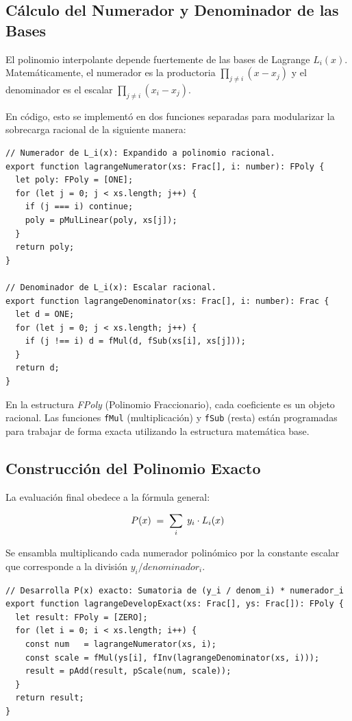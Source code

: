 \documentclass[conference]{IEEEtran}
\begin{document}
\subsection{Cálculo del Numerador y Denominador de las Bases}
El polinomio interpolante depende fuertemente de las bases de Lagrange $L_i(x)$. Matemáticamente, el numerador es la productoria $\prod_{j \neq i} (x - x_j)$ y el denominador es el escalar $\prod_{j \neq i} (x_i - x_j)$. 

\vspace{0.2cm}

En código, esto se implementó en dos funciones separadas para modularizar la sobrecarga racional de la siguiente manera:

\begin{lstlisting}[caption={Algoritmo para calcular las bases racionales}, label={lst:bases}]
// Numerador de L_i(x): Expandido a polinomio racional.
export function lagrangeNumerator(xs: Frac[], i: number): FPoly {
  let poly: FPoly = [ONE];
  for (let j = 0; j < xs.length; j++) {
    if (j === i) continue;
    poly = pMulLinear(poly, xs[j]);
  }
  return poly;
}

// Denominador de L_i(x): Escalar racional.
export function lagrangeDenominator(xs: Frac[], i: number): Frac {
  let d = ONE;
  for (let j = 0; j < xs.length; j++) {
    if (j !== i) d = fMul(d, fSub(xs[i], xs[j]));
  }
  return d;
}
\end{lstlisting}

En la estructura \textit{FPoly} (Polinomio Fraccionario), cada coeficiente es un objeto racional. Las funciones \texttt{fMul} (multiplicación) y \texttt{fSub} (resta) están programadas para trabajar de forma exacta utilizando la estructura matemática base.

\subsection{Construcción del Polinomio Exacto}
La evaluación final obedece a la fórmula general:

\begin{equation}
P(x) \; = \; \sum_{i} \; y_i \cdot L_i(x)
\vspace{0.1cm}
\end{equation}

Se ensambla multiplicando cada numerador polinómico por la constante escalar que corresponde a la división $y_i / denominador_i$. 

\begin{lstlisting}[caption={Algoritmo principal de interpolación de Lagrange}, label={lst:exact}]
// Desarrolla P(x) exacto: Sumatoria de (y_i / denom_i) * numerador_i
export function lagrangeDevelopExact(xs: Frac[], ys: Frac[]): FPoly {
  let result: FPoly = [ZERO];
  for (let i = 0; i < xs.length; i++) {
    const num   = lagrangeNumerator(xs, i);
    const scale = fMul(ys[i], fInv(lagrangeDenominator(xs, i)));
    result = pAdd(result, pScale(num, scale));
  }
  return result;
}
\end{lstlisting}
\end{document}
